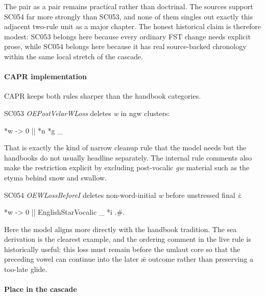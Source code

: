 \documentclass[
  british,
  a4paper,
]{article}
\newenvironment{Shaded}{}{}
\newcommand{\NormalTok}[1]{#1}
\newcounter{none} %
\begin{document}
The pair as a pair remains practical rather than doctrinal. The sources
support SC054 far more strongly than SC053, and none of them singles out
exactly this adjacent two-rule unit as a major chapter. The honest
historical claim is therefore modest: SC053 belongs here because every
ordinary FST change needs explicit prose, while SC054 belongs here
because it has real source-backed chronology within the same local
stretch of the cascade.

\paragraph{CAPR implementation}\label{capr-implementation-33}

CAPR keeps both rules sharper than the handbook categories.

SC053 \emph{OEPostVelarWLoss} deletes \emph{w} in ngw clusters:

\begin{Shaded}
\begin{Highlighting}[]
\NormalTok{*w {-}\textgreater{} 0 || *n *g \_}
\end{Highlighting}
\end{Shaded}

That is exactly the kind of narrow cleanup rule that the model needs but
the handbooks do not usually headline separately. The internal rule
comments also make the restriction explicit by excluding post-vocalic
\emph{gw} material such as the etyma behind snow and swallow.

SC054 \emph{OEWLossBeforeI} deletes non-word-initial \emph{w} before
unstressed final \emph{i}:

\begin{Shaded}
\begin{Highlighting}[]
\NormalTok{*w {-}\textgreater{} 0 || EnglishStarVocalic \_ *i .\#.}
\end{Highlighting}
\end{Shaded}

Here the model aligns more directly with the handbook tradition. The sea
derivation is the clearest example, and the ordering comment in the live
rule is historically useful: this loss must remain before the umlaut
core so that the preceding vowel can continue into the later ǣ outcome
rather than preserving a too-late glide.

\paragraph{Place in the cascade}\label{place-in-the-cascade-33}
\end{document}
